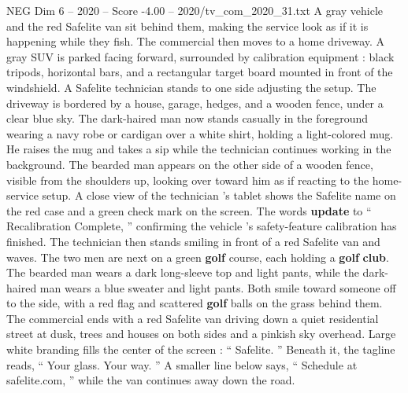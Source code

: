 \begin{textsample}{NEG Dim 6 – 2020 – Score -4.00 – 2020/tv\_com\_2020\_31.txt}
A gray vehicle and the red Safelite van sit behind them, making the service look as if it is happening while they fish.
The commercial then moves to a home driveway.
A gray SUV is parked facing forward, surrounded by calibration equipment : black tripods, horizontal bars, and a rectangular target board mounted in front of the windshield.
A Safelite technician stands to one side adjusting the setup.
The driveway is bordered by a house, garage, hedges, and a wooden fence, under a clear blue sky.
The dark-haired man now stands casually in the foreground wearing a navy robe or cardigan over a white shirt, holding a light-colored mug.
He raises the mug and takes a sip while the technician continues working in the background.
The bearded man appears on the other side of a wooden fence, visible from the shoulders up, looking over toward him as if reacting to the home-service setup.
A close view of the technician ’s tablet shows the Safelite name on the red case and a green check mark on the screen.
The words \textbf{update} to “ Recalibration Complete, ” confirming the vehicle ’s safety-feature calibration has finished.
The technician then stands smiling in front of a red Safelite van and waves.
The two men are next on a green \textbf{golf} course, each holding a \textbf{golf} \textbf{club}.
The bearded man wears a dark long-sleeve top and light pants, while the dark-haired man wears a blue sweater and light pants.
Both smile toward someone off to the side, with a red flag and scattered \textbf{golf} balls on the grass behind them.
The commercial ends with a red Safelite van driving down a quiet residential street at dusk, trees and houses on both sides and a pinkish sky overhead.
Large white branding fills the center of the screen : “ Safelite. ” Beneath it, the tagline reads, “ Your glass.
Your way. ” A smaller line below says, “ Schedule at safelite.com, ” while the van continues away down the road.

\end{textsample}
